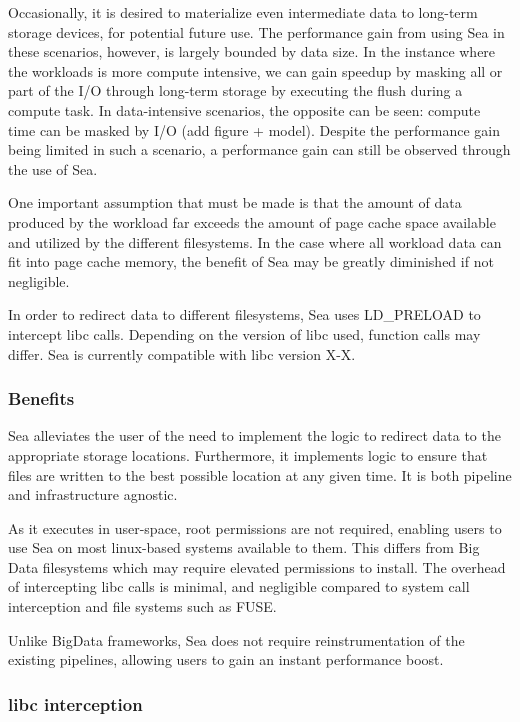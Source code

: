 \documentclass[10pt,journal,compsoc]{IEEEtran}
\begin{document}
Occasionally, it is desired to materialize even intermediate data to long-term storage devices, for potential future use. The
performance gain from using Sea in these scenarios, however, is largely bounded by data size. In the instance where the workloads is more compute intensive,
we can gain speedup by masking all or part of the I/O through long-term storage by executing the flush during a compute task. In data-intensive scenarios, the 
opposite can be seen: compute time can be masked by I/O (add figure + model). Despite the performance gain being limited in
such a scenario, a performance gain can still be observed through the use of Sea.

One important assumption that must be made is that the amount of data produced by the workload far exceeds the amount of page cache space available and utilized
by the different filesystems. In the case where all workload data can fit into page cache memory, the benefit of Sea may be
greatly diminished if not negligible.

In order to redirect data to different filesystems, Sea uses LD\_PRELOAD to intercept libc calls. Depending on the
version of libc used, function calls may differ. Sea is currently compatible with libc version X-X.


\subsubsection{Benefits}
Sea alleviates the user of the need to implement the logic to redirect data to the appropriate
storage locations. Furthermore, it implements logic to ensure that files are written to the best possible
location at any given time. It is both pipeline and infrastructure agnostic. 

As it executes in user-space, root permissions are not required, enabling users to use Sea on most linux-based systems
available to them. This differs from Big Data filesystems which may require elevated permissions to install.
The overhead of intercepting libc calls
is minimal, and negligible compared to system call interception and file systems such as FUSE.

Unlike BigData frameworks, Sea does not require reinstrumentation of the existing pipelines, allowing
users to gain an instant performance boost.

\subsubsection{libc interception}
\end{document}
